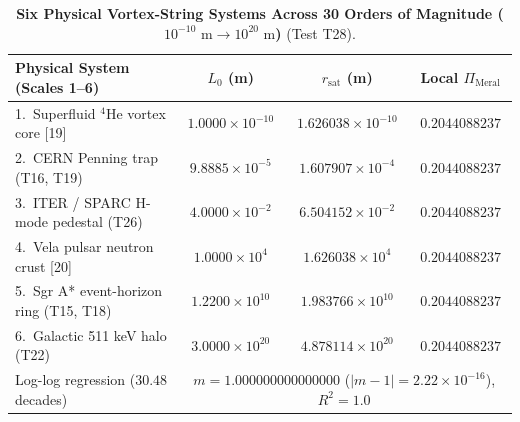 \documentclass[12pt,a4paper]{article}
\begin{document}
\begin{table}[!htbp]
\centering
\footnotesize
\setlength{\tabcolsep}{2pt}
\caption{\textbf{Six Physical Vortex-String Systems Across 30 Orders of Magnitude ($10^{-10}\text{ m}\to 10^{20}\text{ m}$)} (Test T28).}
\label{tab:t28_scales}
\vspace{0.1cm}
\begin{tabular}{@{}l|c|c|c@{}}
\hline
\textbf{Physical System (Scales 1--6)} & \textbf{$L_0$ (m)} & \textbf{$r_{\mathrm{sat}}$ (m)} & \textbf{Local $\Pi_{\mathrm{Meral}}$} \\
\hline
1.\ Superfluid $^4\mathrm{He}$ vortex core [19] & $1.0000\times 10^{-10}$ & $1.626038\times 10^{-10}$ & $0.2044088237$ \\
2.\ CERN Penning trap (T16, T19) & $9.8885\times 10^{-5}$ & $1.607907\times 10^{-4}$ & $0.2044088237$ \\
3.\ ITER / SPARC H-mode pedestal (T26) & $4.0000\times 10^{-2}$ & $6.504152\times 10^{-2}$ & $0.2044088237$ \\
4.\ Vela pulsar neutron crust [20] & $1.0000\times 10^{4}$ & $1.626038\times 10^{4}$ & $0.2044088237$ \\
5.\ Sgr A* event-horizon ring (T15, T18) & $1.2200\times 10^{10}$ & $1.983766\times 10^{10}$ & $0.2044088237$ \\
6.\ Galactic 511 keV halo (T22) & $3.0000\times 10^{20}$ & $4.878114\times 10^{20}$ & $0.2044088237$ \\
\hline
Log-log regression ($30.48$ decades) & \multicolumn{3}{c}{$m = 1.000000000000000$ ($|m-1|=2.22\times 10^{-16}$), $R^2 = 1.0$} \\
\hline
\end{tabular}
\end{table}
\end{document}
